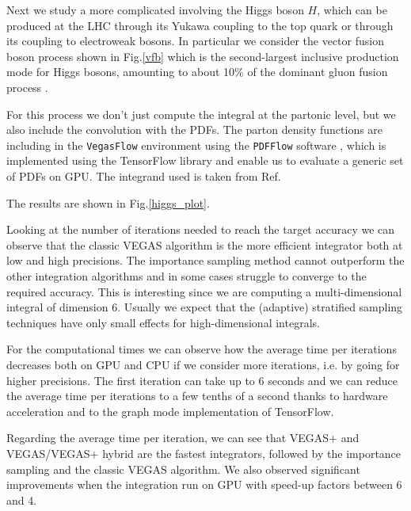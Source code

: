 \documentclass[../main/main.tex]{subfiles}
\begin{document}
Next we study a more complicated involving the Higgs boson $H$, which can be produced at the LHC through its Yukawa coupling to the top quark or through its coupling to electroweak bosons. In particular we consider the vector fusion boson process shown in Fig.\ref{vfb} which is the second-largest inclusive production mode for Higgs bosons, amounting to about 10\% of the dominant gluon fusion process \cite{Cruz_Martinez_2018}.

For this process we don't just compute the integral at the partonic level, but we also include the convolution with the PDFs. 
The parton density functions are including in the \texttt{VegasFlow} environment using the \texttt{PDFFlow} software \cite{Carrazza_2021,juan_m_cruz_martinez_2021_4903010}, which is implemented using the TensorFlow library and enable us to evaluate a generic set of PDFs on GPU. 
The integrand used is taken from Ref\cite{juan_m_cruz_martinez_2021_4903010}.

The results are shown in Fig.\ref{higgs_plot}.

Looking at the number of iterations needed to reach the target accuracy we can observe that the classic VEGAS algorithm is the more efficient integrator both at low and high precisions. The importance sampling method cannot outperform the other integration algorithms and in some cases struggle to converge to the required accuracy. This is interesting since we are computing a multi-dimensional integral of dimension 6. Usually we expect that the (adaptive) stratified sampling techniques have only small effects for high-dimensional integrals.

For the computational times we can observe how the average time per iterations decreases both on GPU and CPU if we consider more iterations, i.e. by going for higher precisions. The first iteration can take up to 6 seconds and we can reduce the average time per iterations to a few tenths of a second thanks to hardware acceleration and to the graph mode implementation of TensorFlow.

Regarding the average time per iteration, we can see that VEGAS+ and VEGAS/VEGAS+ hybrid are the fastest integrators, followed by the importance sampling and the classic VEGAS algorithm. We also observed significant improvements when the integration run on GPU with speed-up factors between 6 and 4.

 
\end{document}
